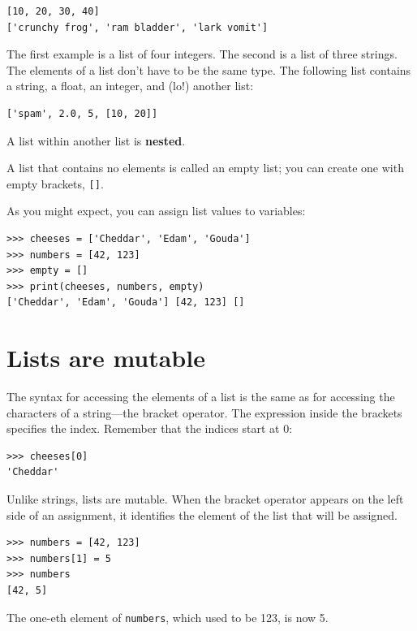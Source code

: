 \documentclass[10pt]{book}
\begin{document}
\begin{verbatim}
[10, 20, 30, 40]
['crunchy frog', 'ram bladder', 'lark vomit']
\end{verbatim}
%
The first example is a list of four integers.  The second is a list of
three strings.  The elements of a list don't have to be the same type.
The following list contains a string, a float, an integer, and
(lo!) another list:

\begin{verbatim}
['spam', 2.0, 5, [10, 20]]
\end{verbatim}
%
A list within another list is {\bf nested}.

A list that contains no elements is
called an empty list; you can create one with empty
brackets, \verb"[]".

As you might expect, you can assign list values to variables:

\begin{verbatim}
>>> cheeses = ['Cheddar', 'Edam', 'Gouda']
>>> numbers = [42, 123]
>>> empty = []
>>> print(cheeses, numbers, empty)
['Cheddar', 'Edam', 'Gouda'] [42, 123] []
\end{verbatim}
%


\section{Lists are mutable}
\label{mutable}

The syntax for accessing the elements of a list is the same as for
accessing the characters of a string---the bracket operator.  The
expression inside the brackets specifies the index.  Remember that the
indices start at 0:

\begin{verbatim}
>>> cheeses[0]
'Cheddar'
\end{verbatim}
%
Unlike strings, lists are mutable.  When the bracket operator appears
on the left side of an assignment, it identifies the element of the
list that will be assigned.

\begin{verbatim}
>>> numbers = [42, 123]
>>> numbers[1] = 5
>>> numbers
[42, 5]
\end{verbatim}
%
The one-eth element of {\tt numbers}, which
used to be 123, is now 5.
\end{document}

